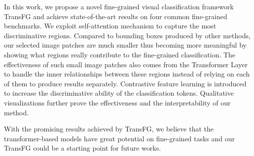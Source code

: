 \documentclass[10pt,twocolumn,letterpaper]{article}
\begin{document}
In this work, we propose a novel fine-grained visual classification framework TransFG and achieve state-of-the-art results on four common fine-grained benchmarks. We exploit self-attention mechanism to capture the most discriminative regions. Compared to bounding boxes produced by other methods, our selected image patches are much smaller thus becoming more meaningful by showing what regions really contribute to the fine-grained classification. The effectiveness of such small image patches also comes from the Transformer Layer to handle the inner relationships between these regions instead of relying on each of them to produce results separately. Contrastive feature learning is introduced to increase the discriminative ability of the classification tokens. Qualitative visualizations further prove the effectiveness and the interpretability of our method. 

With the promising results achieved by TransFG, we believe that the transformer-based models have great potential on fine-grained tasks and our TransFG could be a starting point for future works.
%
 
{\small


}
\end{document}
